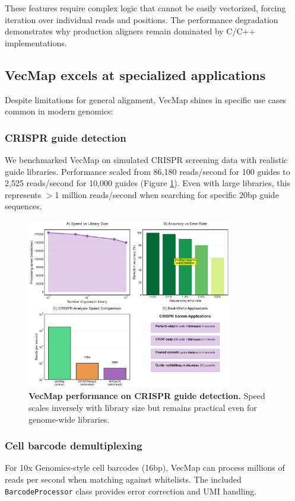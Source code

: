 \documentclass[12pt]{article}
\begin{document}
These features require complex logic that cannot be easily vectorized, forcing iteration over individual reads and positions. The performance degradation demonstrates why production aligners remain dominated by C/C++ implementations.

\subsection{VecMap excels at specialized applications}

Despite limitations for general alignment, VecMap shines in specific use cases common in modern genomics:

\subsubsection{CRISPR guide detection}
We benchmarked VecMap on simulated CRISPR screening data with realistic guide libraries. Performance scaled from 86,180 reads/second for 100 guides to 2,525 reads/second for 10,000 guides (Figure \ref{fig:crispr}). Even with large libraries, this represents $>$1 million reads/second when searching for specific 20bp guide sequences.

\begin{figure}[H]
\centering
\includegraphics[width=0.8\textwidth]{docs/figures/figure3_crispr_detail.pdf}
\caption{\textbf{VecMap performance on CRISPR guide detection.} Speed scales inversely with library size but remains practical even for genome-wide libraries.}
\label{fig:crispr}
\end{figure}

\subsubsection{Cell barcode demultiplexing}
For 10x Genomics-style cell barcodes (16bp), VecMap can process millions of reads per second when matching against whitelists. The included \texttt{BarcodeProcessor} class provides error correction and UMI handling.
\end{document}
